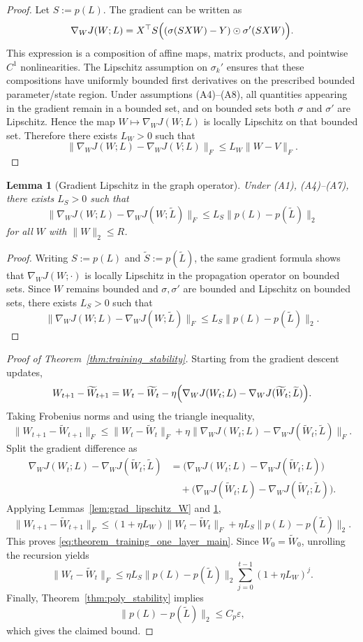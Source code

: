 \documentclass{article}
\newtheorem{lemma}{Lemma}
\begin{document}
\begin{proof}
Let $S:=p(L)$. The gradient can be written as
\[
\nabla_W J(W;L)
=
X^\top S\Bigl((\sigma(SXW)-Y)\odot \sigma'(SXW)\Bigr).
\]
This expression is a composition of affine maps, matrix products, and pointwise $C^1$ nonlinearities. The Lipschitz assumption on $\sigma_k'$ ensures that these compositions have uniformly
bounded first derivatives on the prescribed bounded parameter/state region.
Under assumptions (A4)--(A8), all quantities appearing in the gradient remain in a bounded set, and on bounded sets both $\sigma$ and $\sigma'$ are Lipschitz. Hence the map $W\mapsto \nabla_W J(W;L)$ is locally Lipschitz on that bounded set. Therefore there exists $L_W>0$ such that
\[
\|\nabla_W J(W;L)-\nabla_W J(V;L)\|_F
\le
L_W\|W-V\|_F.
\]
\end{proof}

\begin{lemma}[Gradient Lipschitz in the graph operator]
\label{lem:grad_lipschitz_S}
Under (A1), (A4)--(A7), there exists $L_S>0$ such that
\[
\|\nabla_W J(W;L)-\nabla_W J(W;\widetilde L)\|_F
\le
L_S \|p(L)-p(\widetilde L)\|_2
\]
for all $W$ with $\|W\|_2\le R$.
\end{lemma}

\begin{proof}
Writing $S:=p(L)$ and $\widetilde S:=p(\widetilde L)$, the same gradient formula shows that $\nabla_W J(W;\cdot)$ is locally Lipschitz in the propagation operator on bounded sets. Since $W$ remains bounded and $\sigma,\sigma'$ are bounded and Lipschitz on bounded sets, there exists $L_S>0$ such that
\[
\|\nabla_W J(W;L)-\nabla_W J(W;\widetilde L)\|_F
\le
L_S\|p(L)-p(\widetilde L)\|_2.
\]
\end{proof}

\begin{proof}[Proof of Theorem~\ref{thm:training_stability}]
Starting from the gradient descent updates,
\[
W_{t+1}-\widetilde W_{t+1}
=
W_t-\widetilde W_t
-
\eta\Bigl(
\nabla_W J(W_t;L)-\nabla_W J(\widetilde W_t;\widetilde L)
\Bigr).
\]
Taking Frobenius norms and using the triangle inequality,
\[
\|W_{t+1}-\widetilde W_{t+1}\|_F
\le
\|W_t-\widetilde W_t\|_F
+
\eta
\|\nabla_W J(W_t;L)-\nabla_W J(\widetilde W_t;\widetilde L)\|_F.
\]
Split the gradient difference as
\begin{align*}
\nabla_W J(W_t;L)-\nabla_W J(\widetilde W_t;\widetilde L)
&=
\bigl(
\nabla_W J(W_t;L)-\nabla_W J(\widetilde W_t;L)
\bigr) \\
&\quad +
\bigl(
\nabla_W J(\widetilde W_t;L)-\nabla_W J(\widetilde W_t;\widetilde L)
\bigr).
\end{align*}
Applying Lemmas~\ref{lem:grad_lipschitz_W} and \ref{lem:grad_lipschitz_S},
\[
\|W_{t+1}-\widetilde W_{t+1}\|_F
\le
(1+\eta L_W)\|W_t-\widetilde W_t\|_F
+
\eta L_S \|p(L)-p(\widetilde L)\|_2.
\]
This proves \eqref{eq:theorem_training_one_layer_main}. Since $W_0=\widetilde W_0$, unrolling the recursion yields
\[
\|W_t-\widetilde W_t\|_F
\le
\eta L_S \|p(L)-p(\widetilde L)\|_2
\sum_{j=0}^{t-1}(1+\eta L_W)^j.
\]
Finally, Theorem~\ref{thm:poly_stability} implies
\[
\|p(L)-p(\widetilde L)\|_2 \le C_p \varepsilon,
\]
which gives the claimed bound.
\end{proof}
\end{document}
